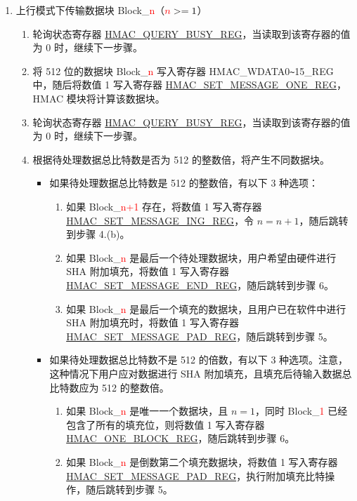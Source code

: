 \documentclass[main\_\_CN.tex]{subfiles}
\begin{document}
\begin{enumerate}
    \item 上行模式下传输数据块 Block\_\textcolor{red}{n}（$\textcolor{red}{n}>=1$）
        \begin{enumerate}
            \item 轮询状态寄存器 \hyperref[regdesc:HMACQUERYBUSYREG]{HMAC\_QUERY\_BUSY\_REG}，当读取到该寄存器的值为 0 时，继续下一步骤。
            \item 将 512 位的数据块 Block\_\textcolor{red}{n} 写入寄存器 HMAC\_WDATA0\verb+~+15\_REG 中，随后将数值 1 写入寄存器 \hyperref[regdesc:HMACSETMESSAGEONEREG]{HMAC\_SET\_MESSAGE\_ONE\_REG}，HMAC 模块将计算该数据块。
            \item 轮询状态寄存器 \hyperref[regdesc:HMACQUERYBUSYREG]{HMAC\_QUERY\_BUSY\_REG}，当读取到该寄存器的值为 0 时，继续下一步骤。
            \item 根据待处理数据总比特数是否为 512 的整数倍，将产生不同数据块。
            \begin{itemize}
                \item 如果待处理数据总比特数是 512 的整数倍，有以下 3 种选项：
                \begin{enumerate}
                    \item 如果 Block\_\textcolor{red}{n+1} 存在，将数值 1 写入寄存器 \hyperref[regdesc:HMACSETMESSAGEINGREG]{HMAC\_SET\_MESSAGE\_ING\_REG}，令 $n=n+1$，随后跳转到步骤 4.(b)。
                    \item 如果 Block\_\textcolor{red}{n} 是最后一个待处理数据块，用户希望由硬件进行 SHA 附加填充，将数值 1 写入寄存器 \hyperref[regdesc:HMACSETMESSAGEENDREG]{HMAC\_SET\_MESSAGE\_END\_REG}，随后跳转到步骤 6。
                    \item 如果 Block\_\textcolor{red}{n} 是最后一个填充的数据块，且用户已在软件中进行 SHA 附加填充时，将数值 1 写入寄存器 \hyperref[regdesc:HMACSETMESSAGEPADREG]{HMAC\_SET\_MESSAGE\_PAD\_REG}，随后跳转到步骤 5。
                \end{enumerate}
                \item 如果待处理数据总比特数不是 512 的倍数，有以下 3 种选项。注意，这种情况下用户应对数据进行 SHA 附加填充，且填充后待输入数据总比特数应为 512 的整数倍。
                \begin{enumerate}
                    \item 如果 Block\_\textcolor{red}{n} 是唯一一个数据块，且 $n=1$，同时 Block\_\textcolor{red}{1} 已经包含了所有的填充位，则将数值 1 写入寄存器 \hyperref[regdesc:HMACONEBLOCKREG]{HMAC\_ONE\_BLOCK\_REG}，随后跳转到步骤 6。
                    \item 如果 Block\_\textcolor{red}{n} 是倒数第二个填充数据块，将数值 1 写入寄存器\\ \hyperref[regdesc:HMACSETMESSAGEPADREG]{HMAC\_SET\_MESSAGE\_PAD\_REG}，执行附加填充比特操作，随后跳转到步骤 5。

\end{enumerate}
\end{itemize}
\end{enumerate}
\end{enumerate}
\end{document}

